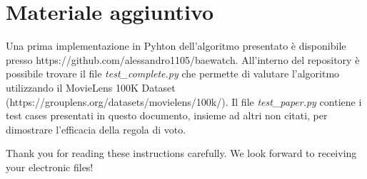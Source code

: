\documentclass[letterpaper]{article}
\begin{document}
\section{Materiale aggiuntivo}
Una prima implementazione in Pyhton dell'algoritmo presentato è disponibile presso https://github.com/alessandro1105/baewatch. All'interno del repository è possibile trovare il file \emph{test\_complete.py} che permette di valutare l'algoritmo utilizzando il MovieLens 100K Dataset (https://grouplens.org/datasets/movielens/100k/). Il file \emph{test\_paper.py} contiene i test cases presentati in questo documento, insieme ad altri non citati, per dimostrare l'efficacia della regola di voto.

\bigskip
\noindent Thank you for reading these instructions carefully. We look forward to receiving your electronic files!

 

\end{document}
